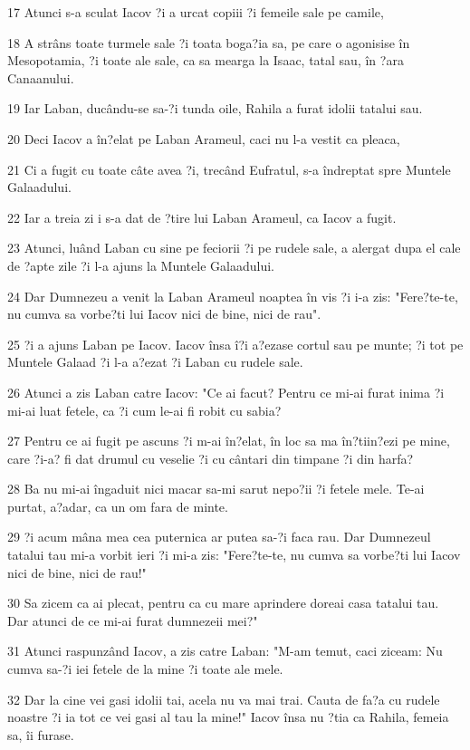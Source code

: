 \par 17 Atunci s-a sculat Iacov ?i a urcat copiii ?i femeile sale pe camile,
\par 18 A strâns toate turmele sale ?i toata boga?ia sa, pe care o agonisise în Mesopotamia, ?i toate ale sale, ca sa mearga la Isaac, tatal sau, în ?ara Canaanului.
\par 19 Iar Laban, ducându-se sa-?i tunda oile, Rahila a furat idolii tatalui sau.
\par 20 Deci Iacov a în?elat pe Laban Arameul, caci nu l-a vestit ca pleaca,
\par 21 Ci a fugit cu toate câte avea ?i, trecând Eufratul, s-a îndreptat spre Muntele Galaadului.
\par 22 Iar a treia zi i s-a dat de ?tire lui Laban Arameul, ca Iacov a fugit.
\par 23 Atunci, luând Laban cu sine pe feciorii ?i pe rudele sale, a alergat dupa el cale de ?apte zile ?i l-a ajuns la Muntele Galaadului.
\par 24 Dar Dumnezeu a venit la Laban Arameul noaptea în vis ?i i-a zis: "Fere?te-te, nu cumva sa vorbe?ti lui Iacov nici de bine, nici de rau".
\par 25 ?i a ajuns Laban pe Iacov. Iacov însa î?i a?ezase cortul sau pe munte; ?i tot pe Muntele Galaad ?i l-a a?ezat ?i Laban cu rudele sale.
\par 26 Atunci a zis Laban catre Iacov: "Ce ai facut? Pentru ce mi-ai furat inima ?i mi-ai luat fetele, ca ?i cum le-ai fi robit cu sabia?
\par 27 Pentru ce ai fugit pe ascuns ?i m-ai în?elat, în loc sa ma în?tiin?ezi pe mine, care ?i-a? fi dat drumul cu veselie ?i cu cântari din timpane ?i din harfa?
\par 28 Ba nu mi-ai îngaduit nici macar sa-mi sarut nepo?ii ?i fetele mele. Te-ai purtat, a?adar, ca un om fara de minte.
\par 29 ?i acum mâna mea cea puternica ar putea sa-?i faca rau. Dar Dumnezeul tatalui tau mi-a vorbit ieri ?i mi-a zis: "Fere?te-te, nu cumva sa vorbe?ti lui Iacov nici de bine, nici de rau!"
\par 30 Sa zicem ca ai plecat, pentru ca cu mare aprindere doreai casa tatalui tau. Dar atunci de ce mi-ai furat dumnezeii mei?"
\par 31 Atunci raspunzând Iacov, a zis catre Laban: "M-am temut, caci ziceam: Nu cumva sa-?i iei fetele de la mine ?i toate ale mele.
\par 32 Dar la cine vei gasi idolii tai, acela nu va mai trai. Cauta de fa?a cu rudele noastre ?i ia tot ce vei gasi al tau la mine!" Iacov însa nu ?tia ca Rahila, femeia sa, îi furase.
